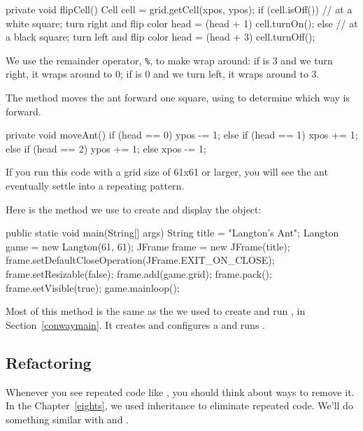 \begin{code}
private void flipCell() {
    Cell cell = grid.getCell(xpos, ypos);
    if (cell.isOff()) {
        // at a white square; turn right and flip color
        head = (head + 1) %
        cell.turnOn();
    } else {
        // at a black square; turn left and flip color
        head = (head + 3) %
        cell.turnOff();
    }
}
\end{code}

We use the remainder operator, \verb"%", to make  wrap around: if  is 3 and we turn right, it wraps around to 0; if  is 0 and we turn left, it wraps around to 3.

The  method moves the ant forward one square, using  to determine which way is forward.

\begin{code}
private void moveAnt() {
    if (head == 0) {
        ypos -= 1;
    } else if (head == 1) {
        xpos += 1;
    } else if (head == 2) {
        ypos += 1;
    } else {
        xpos -= 1;
    }
}
\end{code}

If you run this code with a grid size of 61x61 or larger, you will see the ant eventually settle into a repeating pattern.

Here is the  method we use to create and display the  object:

\begin{code}
public static void main(String[] args) {
    String title = "Langton's Ant";
    Langton game = new Langton(61, 61);
    JFrame frame = new JFrame(title);
    frame.setDefaultCloseOperation(JFrame.EXIT_ON_CLOSE);
    frame.setResizable(false);
    frame.add(game.grid);
    frame.pack();
    frame.setVisible(true);
    game.mainloop();
}
\end{code}

Most of this method is the same as the  we used to create and run , in Section~\ref{conwaymain}.
It creates and configures a  and runs .


\subsection*{Refactoring}

Whenever you see repeated code like , you should think about ways to remove it.
In the Chapter~\ref{eights}, we used inheritance to eliminate repeated code.
We'll do something similar with  and .

